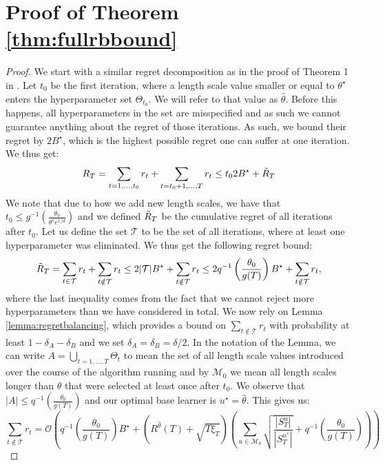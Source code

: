 \documentclass{article}
\theoremstyle{plain}
\theoremstyle{definition}
\theoremstyle{remark}
\theoremstyle{plain}
\begin{document}
\section{Proof of Theorem \ref{thm:fullrbbound}} \label{app:fullrbbound}
\fullrbbound*
\begin{proof}
We start with a similar regret decomposition as in the proof of Theorem 1 in \cite{berkenkamp2019no}. Let $t_0$ be the first iteration, where a length scale value smaller or equal to $\theta^\star$ enters the hyperparameter set $\Theta_{t_0}$. We will refer to that value as $\hat{\theta}$. Before this happens, all hyperparameters in the set are misspecified and as such we cannot guarantee anything about the regret of those iterations. As such, we bound their regret by $2B^\star$, which is the highest possible regret one can suffer at one iteration. We thus get:
\begin{equation} \label{eq:mainprooffirstdecomp}
    R_T = \sum_{t=1,\dots,t_0} r_t + \sum_{t=t_0+1,\dots,T} r_t \le t_02B^\star + \Tilde{R}_T
\end{equation}
We note that due to how we add new length scales, we have that $t_0 \le g^{-1}(\frac{\theta_0}{\theta^\star e^{1/d}}) $ and we defined $\Tilde{R}_T$ be the cumulative regret of all iterations after $t_0$. Let us define the set $\mathcal{T}$ to be the set of all iterations, where at least one hyperparameter was eliminated. We thus get the following regret bound:
\begin{equation*}
    \Tilde{R}_T = \sum_{t \in \mathcal{T}} r_t + \sum_{t \notin \mathcal{T}} r_t \le 2|\mathcal{T}|B^\star + \sum_{t \notin \mathcal{T}} r_t  \le 2q^{-1}\left(\frac{\theta_0}{g(T)}\right)B^\star + \sum_{t \notin \mathcal{T}} r_t,
\end{equation*}
where the last inequality comes from the fact that we cannot reject more hyperparameters than we have considered in total. We now rely on Lemma \ref{lemma:regretbalancing}, which provides a bound on $\sum_{t \notin \mathcal{T}} r_t$ with probability at least $1 - \delta_A - \delta_B$ and we set $\delta_A = \delta_B = \delta / 2$. 
In the notation of the Lemma, we can write $A = \underset{t=1,\dots,T}{\bigcup}\Theta_t $ to mean the set of all length scale values introduced over the course of the algorithm running and by $\mathcal{M}_0$ we mean all length scales longer than $\hat{\theta}$ that were selected at least once after $t_0$. We observe that $|A| \le q^{-1}\left(\frac{\theta_0}{g(T)}\right)$ and our optimal base learner is $u^\star = \hat{\theta}$. This gives us:
\begin{equation*}
     \sum_{t \notin \mathcal{T}} r_t  = \mathcal{O} \left(q^{-1}\left(\frac{\theta_0}{g(T)}\right)B^\star + \left(R^{\hat{\theta}}(T) + \sqrt{T\xi_T}  \right) \left( \sum_{u \in \mathcal{M}_0}\sqrt{\frac{|S_T^{u}|}{|S_T^{u^*}|}} + q^{-1}\left(\frac{\theta_0}{g(T)}\right) \right) \right)
\end{equation*}



\end{proof}
\end{document}
